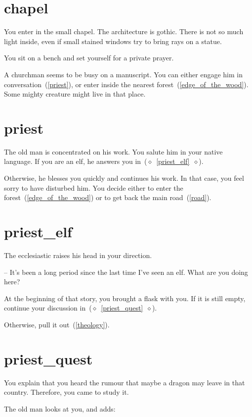 \section{chapel}

You enter in the small chapel. The architecture is gothic. There is not so much
light inside, even if small stained windows try to bring rays on a statue.

You sit on a bench and set yourself for a private prayer.

A churchman seems to be busy on a manuscript. You can either engage him in
conversation~(\ref{priest}), or enter inside the nearest
forest~(\ref{edge_of_the_wood}). Some mighty creature might live in that place.

\section{priest}

The old man is concentrated on his work. You salute him in your native language.
If you are an elf, he answers you in~($\diamond$~\ref{priest_elf}~$\diamond$).

Otherwise, he blesses you quickly and continues his work. In that case, you feel
sorry to have disturbed him. You decide either to enter the
forest~(\ref{edge_of_the_wood}) or to get back the main road~(\ref{road}).

\section{priest_elf}

The ecclesiastic raises his head in your direction.

-- It's been a long period since the last time I've seen an elf. What are you
doing here?

At the beginning of that story, you brought a flask with you. If it is still
empty, continue your discussion in~($\diamond$~\ref{priest_quest}~$\diamond$).

Otherwise, pull it
out~(\ref{theology}).

\section{priest_quest}

You explain that you heard the rumour that maybe a dragon may leave in that
country. Therefore, you came to study it.

The old man looks at you, and adds:

